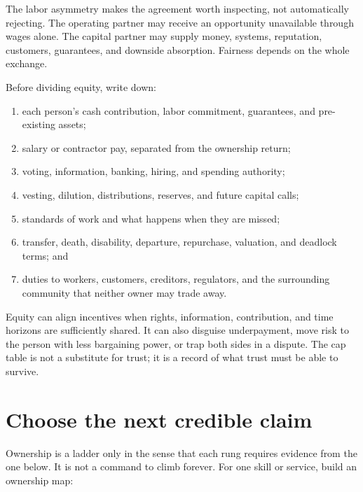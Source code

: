 The labor asymmetry makes the agreement worth inspecting, not automatically
rejecting. The operating partner may receive an opportunity unavailable through
wages alone. The capital partner may supply money, systems, reputation,
customers, guarantees, and downside absorption. Fairness depends on the whole
exchange.

Before dividing equity, write down:

\begin{enumerate}[itemsep=0.12em]
\item each person's cash contribution, labor commitment, guarantees, and
  pre-existing assets;
\item salary or contractor pay, separated from the ownership return;
\item voting, information, banking, hiring, and spending authority;
\item vesting, dilution, distributions, reserves, and future capital calls;
\item standards of work and what happens when they are missed;
\item transfer, death, disability, departure, repurchase, valuation, and
  deadlock terms; and
\item duties to workers, customers, creditors, regulators, and the surrounding
  community that neither owner may trade away.
\end{enumerate}

Equity can align incentives when rights, information, contribution, and time
horizons are sufficiently shared. It can also disguise underpayment, move risk
to the person with less bargaining power, or trap both sides in a dispute. The
cap table is not a substitute for trust; it is a record of what trust must be
able to survive.

\section{Choose the next credible claim}

Ownership is a ladder only in the sense that each rung requires evidence from
the one below. It is not a command to climb forever. For one skill or service,
build an ownership map:

